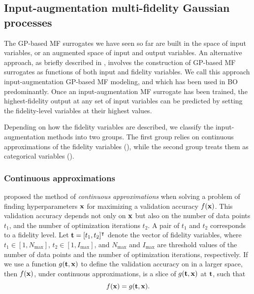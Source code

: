 \documentclass[iicol,sn-basic]{sn-jnl}%
\begin{document}
\subsection{Input-augmentation multi-fidelity Gaussian processes}\label{Sec46}

The GP-based MF surrogates we have seen so far are built in the space of input variables, or an augmented space of input and output variables.
An alternative approach, as briefly described in , involves the construction of GP-based MF surrogates as functions of both input and fidelity variables.
We call this approach input-augmentation GP-based MF modeling, and which has been used in BO predominantly.
Once an input-augmentation MF surrogate has been trained, the highest-fidelity output at any set of input variables can be predicted by setting the fidelity-level variables at their highest values.

Depending on how the fidelity variables are described, we classify the input-augmentation methods into two groups.
The first group relies on continuous approximations of the fidelity variables (), while the second group treats them as categorical variables ().

\subsubsection{Continuous approximations}\label{Sec461}

\cite{Kandasamy2017} proposed the method of \textit{continuous approximations} when solving a problem of finding hyperparameters ${\bf x}$ for maximizing a validation accuracy $f({\bf x})$.
This validation accuracy depends not only on ${\bf x}$ but also on the number of data points $t_1$, and the number of optimization iterations $t_2$.
A pair of $t_1$ and $t_2$ corresponds to a fidelity level.
Let ${\bf t}=[t_1,t_2]^\intercal$ denote the vector of fidelity variables, where $t_1 \in [1,N_{\max}]$, $t_2 \in [1,I_{\max}]$, and $N_{\max}$ and $I_{\max}$ are threshold values of the number of data points and the number of optimization iterations, respectively.
If we use a function $g({\bf t},{\bf x})$ to define the validation accuracy on in a larger space, then $f({\bf x})$, under continuous approximations, is a slice of $g({\bf t},{\bf x})$ at ${\bf t}$, such that
\begin{equation}\label{eqn29}
	f({\bf x}) = g({\bf t},{\bf x}).
\end{equation}
\end{document}
